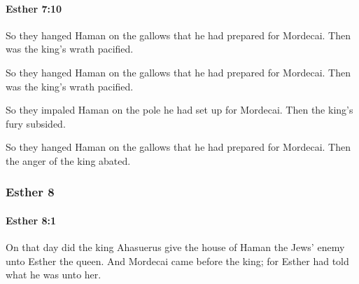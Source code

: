 		\paragraph{Esther 7:10} %
			\label{ESTHER-7-10}

			So they hanged Haman on the gallows that he had prepared for Mordecai. Then was the king’s wrath pacified.

			\begin{versebox}
					\item[BHS] 
					\item[LXX] 
					\item[ASV] So they hanged Haman on the gallows that he had prepared for Mordecai. Then was the king's wrath pacified.
					\item[NIV] So they impaled Haman on the pole he had set up for Mordecai. Then the king’s fury subsided.
					\item[NRSV] So they hanged Haman on the gallows that he had prepared for Mordecai. Then the anger of the king abated.
			\end{versebox}
	\subsubsection{Esther 8} %
		\label{ESTHER-8}

		\paragraph{Esther 8:1} %
			\label{ESTHER-8-1}

			On that day did the king Ahasuerus give the house of Haman the Jews’ enemy unto Esther the queen. And Mordecai came before the king; for Esther had told what he was unto her.

